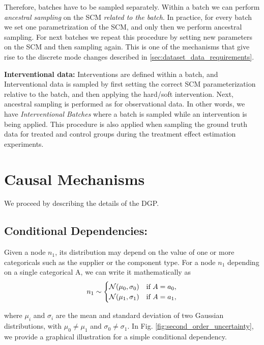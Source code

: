 Therefore, batches have to be sampled separately. Within a batch we can perform \textit{ancestral sampling} \citep{koller} on the SCM \textit{related to the batch}. 
In practice, for every batch we set one parametrization of the SCM, and only then we perform ancestral sampling. For next batches we repeat this procedure by setting new parameters on the SCM and then sampling again. This is one of the mechanisms that give rise to the discrete mode changes described in \ref{sec:dataset_data_requirements}.

\textbf{Interventional data:} Interventions are defined within a batch, and Interventional data is sampled by first setting the correct SCM parameterization relative to the batch, and then applying the hard/soft intervention. 
Next, ancestral sampling  is performed as for observational data. 
In other words, we have \textit{Interventional Batches} where a batch is sampled while an intervention is being applied. This procedure is also applied when sampling the ground truth data for treated and control groups during the treatment effect estimation experiments.

\section{Causal Mechanisms} \label{sec:appendix_conditional_depepdences}

We proceed by describing the details of the DGP.

\subsection{Conditional Dependencies:} Given a node $n_1$, its distribution may depend on the value of one or more categoricals such as the supplier or the component type. For a node $n_1$ depending on a single categorical A, we can write it mathematically as
\begin{equation}
    n_1 \sim \begin{cases}
    \mathcal{N}(\mu_0, \sigma_0) & \text{if $ A = a_0$},\\
    \mathcal{N}(\mu_1, \sigma_1) & \text{if $A = a_1$},
  \end{cases} 
\end{equation}

where $\mu_i$ and $\sigma_i$ are the mean and standard deviation of two Gaussian distributions, with $\mu_0 \neq \mu_1$ and $\sigma_0 \neq \sigma_1$. In Fig. \ref{fig:second_order_uncertainty}, we provide a graphical illustration for a simple conditional dependency.

